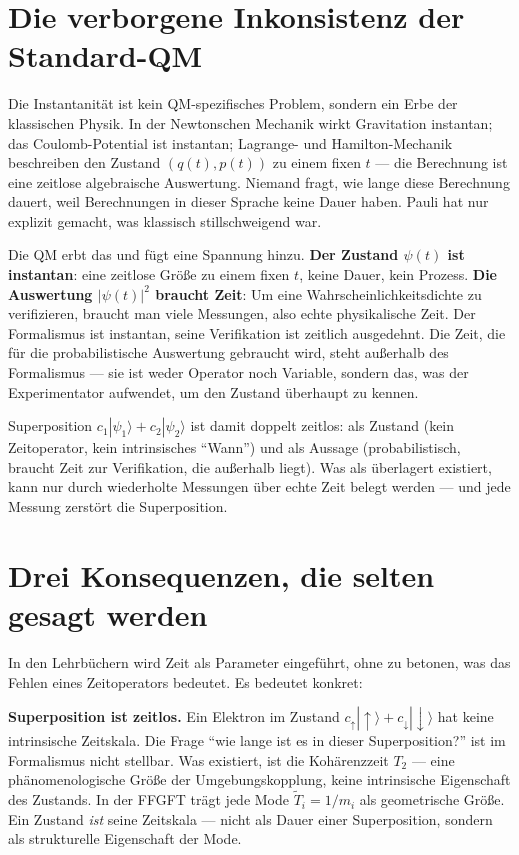 \section{Die verborgene Inkonsistenz der Standard-QM}

Die Instantanität ist kein QM-spezifisches Problem, sondern ein Erbe der
klassischen Physik. In der Newtonschen Mechanik wirkt Gravitation
instantan; das Coulomb-Potential ist instantan; Lagrange- und
Hamilton-Mechanik beschreiben den Zustand $(q(t),p(t))$ zu einem fixen
$t$ --- die Berechnung ist eine zeitlose algebraische Auswertung. Niemand
fragt, wie lange diese Berechnung dauert, weil Berechnungen in dieser
Sprache keine Dauer haben. Pauli hat nur explizit gemacht, was klassisch
stillschweigend war.

Die QM erbt das und fügt eine Spannung hinzu. \textbf{Der Zustand
$\psi(t)$ ist instantan}: eine zeitlose Größe zu einem fixen $t$, keine
Dauer, kein Prozess. \textbf{Die Auswertung $|\psi(t)|^2$ braucht
Zeit}: Um eine Wahrscheinlichkeitsdichte zu verifizieren, braucht man
viele Messungen, also echte physikalische Zeit. Der Formalismus ist
instantan, seine Verifikation ist zeitlich ausgedehnt. Die Zeit, die
für die probabilistische Auswertung gebraucht wird, steht außerhalb des
Formalismus --- sie ist weder Operator noch Variable, sondern das, was
der Experimentator aufwendet, um den Zustand überhaupt zu kennen.

Superposition $c_1|\psi_1\rangle+c_2|\psi_2\rangle$ ist damit doppelt
zeitlos: als Zustand (kein Zeitoperator, kein intrinsisches
\enquote{Wann}) und als Aussage (probabilistisch, braucht Zeit zur
Verifikation, die außerhalb liegt). Was als überlagert existiert, kann
nur durch wiederholte Messungen über echte Zeit belegt werden --- und
jede Messung zerstört die Superposition.

\section{Drei Konsequenzen, die selten gesagt werden}

In den Lehrbüchern wird Zeit als Parameter eingeführt, ohne zu betonen,
was das Fehlen eines Zeitoperators bedeutet. Es bedeutet konkret:

\textbf{Superposition ist zeitlos.} Ein Elektron im Zustand
$c_\uparrow|\uparrow\rangle+c_\downarrow|\downarrow\rangle$ hat keine
intrinsische Zeitskala. Die Frage \enquote{wie lange ist es in dieser
Superposition?} ist im Formalismus nicht stellbar. Was existiert, ist
die Kohärenzzeit $T_2$ --- eine phänomenologische Größe der
Umgebungskopplung, keine intrinsische Eigenschaft des Zustands. In der
FFGFT trägt jede Mode $\tilde T_i = 1/m_i$ als geometrische Größe. Ein
Zustand \emph{ist} seine Zeitskala --- nicht als Dauer einer
Superposition, sondern als strukturelle Eigenschaft der Mode.

